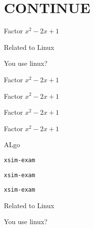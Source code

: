 \documentclass{article}
\begin{document}
\section{CONTINUE}



\begin{enumext}[columns=1, resume, start=20, nosep,save-ref=true,wrap-label={\fbox{#1}}]
  \item Factor $x^{2}-2x+1$ %
  \item Related to Linux
    \begin{enumext*}[nosep,columns*=2,start=M]
      \item You use linux? %
      \item Factor $x^{2}-2x+1$ %
      \item Factor $x^{2}-2x+1$ %
    \end{enumext*}
   \item Factor $x^{2}-2x+1$ %
   \item Factor $x^{2}-2x+1$ %
   \item ALgo
         \begin{enumext}[nosep]
          \item* \texttt{xsim-exam} %
           \item* \texttt{xsim-exam} %
            \item* \texttt{xsim-exam} %
        \end{enumext}
\end{enumext}



\begin{enumext*}[columns=1]
  \item Related to Linux
    \begin{enumext}[nosep,columns*=2,start=M]
      \item You use linux? %
    \end{enumext}
\end{enumext*}


\stop
\newpage
\end{document}

